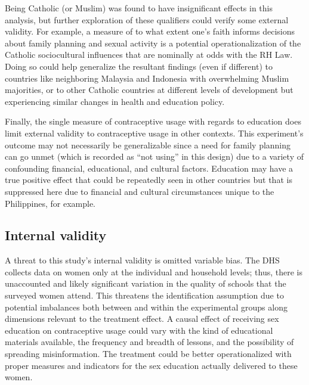 \documentclass[12pt]{article}
\begin{document}
    Being Catholic (or Muslim) was found to have insignificant effects in this analysis, but further exploration of these qualifiers could verify some external validity.
    For example, a measure of to what extent one's faith informs decisions about family planning and sexual activity is a potential operationalization of the Catholic sociocultural influences that are nominally at odds with the RH Law.
    Doing so could help generalize the resultant findings (even if different) to countries like neighboring Malaysia and Indonesia with overwhelming Muslim majorities, or to other Catholic countries at different levels of development but experiencing similar changes in health and education policy.

    Finally, the single measure of contraceptive usage with regards to education does limit external validity to contraceptive usage in other contexts. 
    This experiment's outcome may not necessarily be generalizable since a need for family planning can go unmet (which is recorded as ``not using'' in this design) due to a variety of confounding financial, educational, and cultural factors.
    Education may have a true positive effect that could be repeatedly seen in other countries but that is suppressed here due to financial and cultural circumstances unique to the Philippines, for example.


    \subsection{Internal validity}
    A threat to this study's internal validity is omitted variable bias. 
    The DHS collects data on women only at the individual and household levels; thus, there is unaccounted and likely significant variation in the quality of schools that the surveyed women attend.
    This threatens the identification assumption due to potential imbalances both between and within the experimental groups along dimensions relevant to the treatment effect.
    A causal effect of receiving sex education on contraceptive usage could vary with the kind of educational materials available, the frequency and breadth of lessons, and the possibility of spreading misinformation.
    The treatment could be better operationalized with proper measures and indicators for the sex education actually delivered to these women.
\end{document}
